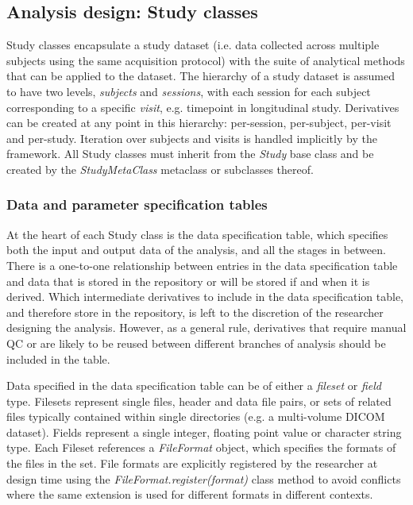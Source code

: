 \hypertarget{analysis-design-study-classes}{%
\subsection{Analysis design: Study
classes}\label{analysis-design-study-classes}}

Study classes encapsulate a study dataset (i.e. data collected across
multiple subjects using the same acquisition protocol) with the suite of
analytical methods that can be applied to the dataset. The hierarchy of
a study dataset is assumed to have two levels, \emph{subjects} and
\emph{sessions}, with each session for each subject corresponding to a
specific \emph{visit}, e.g. timepoint in longitudinal study. Derivatives
can be created at any point in this hierarchy: per-session, per-subject,
per-visit and per-study. Iteration over subjects and visits is handled
implicitly by the framework. All Study classes must inherit from the
\emph{Study} base class and be created by the \emph{StudyMetaClass}
metaclass or subclasses thereof.

\hypertarget{data-and-parameter-specification-tables}{%
\subsubsection{Data and parameter specification
tables}\label{data-and-parameter-specification-tables}}

At the heart of each Study class is the data specification table, which
specifies both the input and output data of the analysis, and all the
stages in between. There is a one-to-one relationship between entries in
the data specification table and data that is stored in the repository
or will be stored if and when it is derived. Which intermediate
derivatives to include in the data specification table, and therefore
store in the repository, is left to the discretion of the researcher
designing the analysis. However, as a general rule, derivatives that
require manual QC or are likely to be reused between different branches
of analysis should be included in the table.

Data specified in the data specification table can be of either a
\emph{fileset} or \emph{field} type. Filesets represent single files,
header and data file pairs, or sets of related files typically contained
within single directories (e.g. a multi-volume DICOM dataset). Fields
represent a single integer, floating point value or character string
type. Each Fileset references a \emph{FileFormat} object, which
specifies the formats of the files in the set. File formats are
explicitly registered by the researcher at design time using the
\emph{FileFormat.register(format)} class method to avoid conflicts where
the same extension is used for different formats in different contexts.

